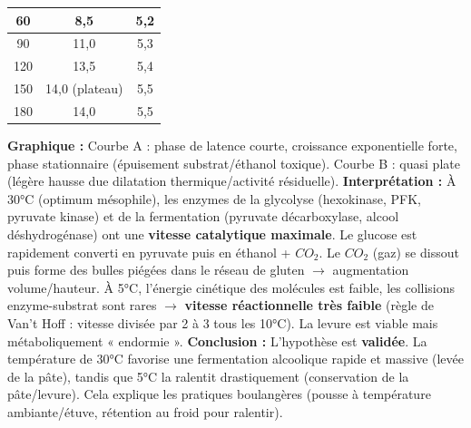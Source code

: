 \documentclass[11pt]{article}
\begin{document}
\begin{exoresolu}
\begin{center}
\begin{tabular}{|c|c|c|}
    60 & 8,5 & 5,2 \\ \hline
    90 & 11,0 & 5,3 \\ \hline
    120 & 13,5 & 5,4 \\ \hline
    150 & 14,0 (plateau) & 5,5 \\ \hline
    180 & 14,0 & 5,5 \\ \hline
    \end{tabular}
    \end{center}
    \textbf{Graphique :} Courbe A : phase de latence courte, croissance exponentielle forte, phase stationnaire (épuisement substrat/éthanol toxique). Courbe B : quasi plate (légère hausse due dilatation thermique/activité résiduelle).
    \textbf{Interprétation :}
    À 30°C (optimum mésophile), les enzymes de la glycolyse (hexokinase, PFK, pyruvate kinase) et de la fermentation (pyruvate décarboxylase, alcool déshydrogénase) ont une \textbf{vitesse catalytique maximale}. Le glucose est rapidement converti en pyruvate puis en éthanol + $CO_2$. Le $CO_2$ (gaz) se dissout puis forme des bulles piégées dans le réseau de gluten $\rightarrow$ augmentation volume/hauteur.
    À 5°C, l'énergie cinétique des molécules est faible, les collisions enzyme-substrat sont rares $\rightarrow$ \textbf{vitesse réactionnelle très faible} (règle de Van't Hoff : vitesse divisée par 2 à 3 tous les 10°C). La levure est viable mais métaboliquement « endormie ».
    \textbf{Conclusion :} L'hypothèse est \textbf{validée}. La température de 30°C favorise une fermentation alcoolique rapide et massive (levée de la pâte), tandis que 5°C la ralentit drastiquement (conservation de la pâte/levure). Cela explique les pratiques boulangères (pousse à température ambiante/étuve, rétention au froid pour ralentir).
\end{exoresolu}
\end{document}
